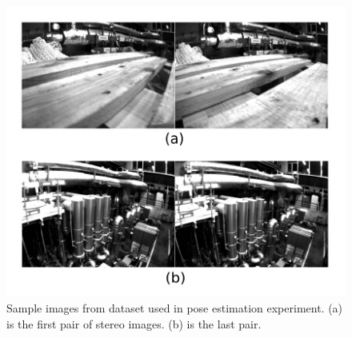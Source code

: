 \documentclass[a4paper, 10pt, conference]{ieeeconf}      %
\begin{document}
\begin{figure}[thpb]
	\centering
	
	\includegraphics[scale=0.7]{sample.jpg}
	
	\caption{Sample images from dataset used in pose estimation experiment. (a) is the first pair of stereo images. (b) is the last pair. }
	\label{figurelabel}
\end{figure}
\end{document}
